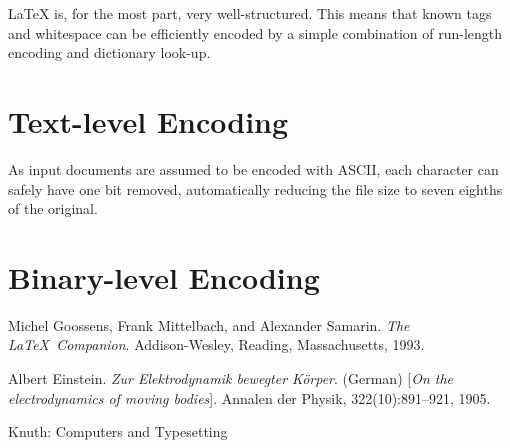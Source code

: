 \documentclass[11pt]{article}
\begin{document}
\begin{multicols*}{2}
        \LaTeX{} is, for the most part, very well-structured.
        This means that known tags and whitespace can be efficiently encoded by a simple combination of run-length encoding and dictionary look-up.


        \section{Text-level Encoding}\label{sec:text-level-encoding}
        As input documents are assumed to be encoded with ASCII, each character can safely have one bit removed, automatically reducing the file size to seven eighths of the original.


        \section{Binary-level Encoding}\label{sec:binary-level-encoding}

    \end{multicols*}

    \pagebreak

    \begin{thebibliography}{9}
        Michel Goossens, Frank Mittelbach, and Alexander Samarin.
        \textit{The \LaTeX\ Companion}.
        Addison-Wesley, Reading, Massachusetts, 1993.

        Albert Einstein.
        \textit{Zur Elektrodynamik bewegter K{\"o}rper}. (German)
        [\textit{On the electrodynamics of moving bodies}].
        Annalen der Physik, 322(10):891–921, 1905.

        Knuth: Computers and Typesetting
    \end{thebibliography}
\end{document}
